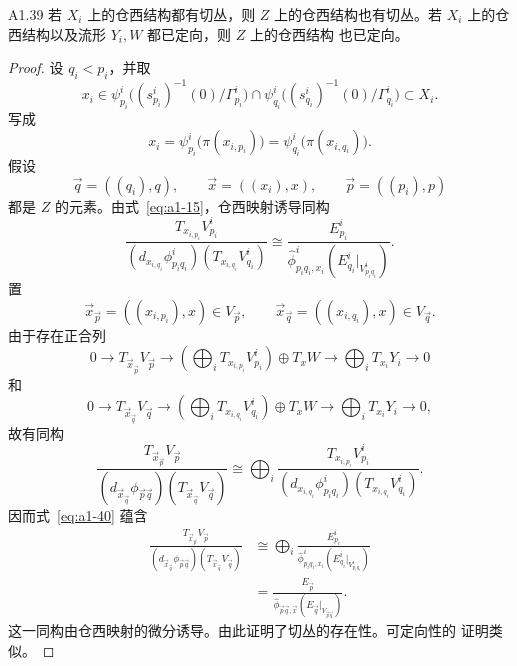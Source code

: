 \begin{lemma}{A1.39}\label{lem:a1-39}
若 $X_i$ 上的仓西结构都有切丛，则 $Z$ 上的仓西结构也有切丛。若
$X_i$ 上的仓西结构以及流形 $Y_i,W$ 都已定向，则 $Z$ 上的仓西结构
也已定向。
\end{lemma}

\begin{proof}
设 $q_i<p_i$，并取
\[
 x_i\in
 \psi_{p_i}^i\bigl((s_{p_i}^i)^{-1}(0)/\Gamma_{p_i}^i\bigr)
 \cap
 \psi_{q_i}^i\bigl((s_{q_i}^i)^{-1}(0)/\Gamma_{q_i}^i\bigr)
 \subset X_i.
\]
写成
\[
 x_i=\psi_{p_i}^i\bigl(\pi(x_{i,p_i})\bigr)
     =\psi_{q_i}^i\bigl(\pi(x_{i,q_i})\bigr).
\]
假设
\[
 \vec q=((q_i),q),
 \qquad \vec x=((x_i),x),
 \qquad \vec p=((p_i),p)
\]
都是 $Z$ 的元素。由式~\eqref{eq:a1-15}，仓西映射诱导同构
\begin{equation}
 \frac{T_{x_{i,p_i}}V_{p_i}^i}
 {(d_{x_{i,q_i}}\phi_{p_iq_i}^i)(T_{x_{i,q_i}}V_{q_i}^i)}
 \cong
 \frac{E_{p_i}^i}
 {\widehat\phi_{p_iq_i,x_i}^i
  (E_{q_i}^i|_{V_{p_iq_i}^i})}.
\tag{A1.40}\label{eq:a1-40}
\end{equation}
置
\[
 \vec x_{\vec p}=((x_{i,p_i}),x)\in V_{\vec p},
 \qquad
 \vec x_{\vec q}=((x_{i,q_i}),x)\in V_{\vec q}.
\]
由于存在正合列
\[
 0\longrightarrow T_{\vec x_{\vec p}}V_{\vec p}
 \longrightarrow
 \left(\bigoplus_iT_{x_{i,p_i}}V_{p_i}^i\right)\oplus T_xW
 \longrightarrow\bigoplus_iT_{x_i}Y_i\longrightarrow0
\]
和
\[
 0\longrightarrow T_{\vec x_{\vec q}}V_{\vec q}
 \longrightarrow
 \left(\bigoplus_iT_{x_{i,q_i}}V_{q_i}^i\right)\oplus T_xW
 \longrightarrow\bigoplus_iT_{x_i}Y_i\longrightarrow0,
\]
故有同构
\begin{equation}
 \frac{T_{\vec x_{\vec p}}V_{\vec p}}
 {(d_{\vec x_{\vec q}}\phi_{\vec p\vec q})
   (T_{\vec x_{\vec q}}V_{\vec q})}
 \cong
 \bigoplus_i
 \frac{T_{x_{i,p_i}}V_{p_i}^i}
 {(d_{x_{i,q_i}}\phi_{p_iq_i}^i)(T_{x_{i,q_i}}V_{q_i}^i)}.
\tag{A1.41}\label{eq:a1-41}
\end{equation}
因而式~\eqref{eq:a1-40} 蕴含
\begin{equation}
\begin{aligned}
 \frac{T_{\vec x_{\vec p}}V_{\vec p}}
 {(d_{\vec x_{\vec q}}\phi_{\vec p\vec q})
   (T_{\vec x_{\vec q}}V_{\vec q})}
 &\cong
 \bigoplus_i
 \frac{E_{p_i}^i}
 {\widehat\phi_{p_iq_i,x_i}^i
  (E_{q_i}^i|_{V_{p_iq_i}^i})}
 \\
 &=
 \frac{E_{\vec p}}
 {\widehat\phi_{\vec p\vec q,\vec x}
  (E_{\vec q}|_{V_{\vec p\vec q}})}.
\end{aligned}
\tag{A1.42}\label{eq:a1-42}
\end{equation}
这一同构由仓西映射的微分诱导。由此证明了切丛的存在性。可定向性的
证明类似。
\end{proof}

